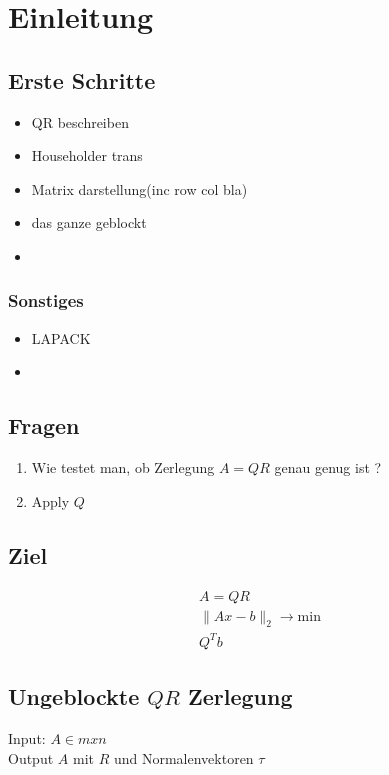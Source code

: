 \chapter{Einleitung}

\section{Erste Schritte}
\begin{itemize}
	\item QR beschreiben
	\item Householder trans
	\item Matrix darstellung(inc row col bla)
	\item das ganze geblockt
	\item 
\end{itemize}

\subsection{Sonstiges}
\begin{itemize}
	\item LAPACK
	\item	
\end{itemize}

\section{Fragen}
\begin{enumerate}
	\item Wie testet man, ob Zerlegung $A=QR$ genau genug ist ?
	\item Apply $Q$
\end{enumerate} 

\section{Ziel}
\begin{align}
	A=QR\\
	\lVert Ax -b \rVert_2 \rightarrow \text{min}\\
	Q^Tb
\end{align}

\section{Ungeblockte $QR$ Zerlegung}
Input: $A \in m x n$\\
Output $A$ mit $R$ und Normalenvektoren $\tau$ 

